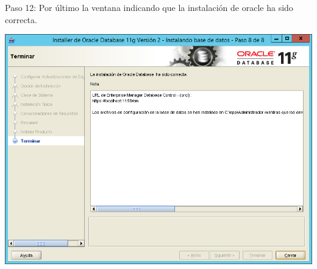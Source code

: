 \documentclass[a4paper,openright,12pt]{book}
\begin{document}
Paso 12: Por último la ventana indicando que la instalación de oracle ha sido correcta.
\begin{center}
\includegraphics[width=15cm]{./windows server/14.png}
\end{center}
\end{document}
